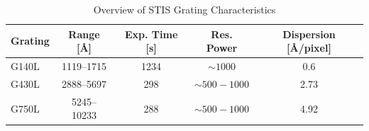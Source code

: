 \begin{table}[h!]
	\centering
	\small
	\caption{Overview of STIS Grating Characteristics \cite{stisgratings}}
	\label{tab:stis_gratings}
	\begin{tabular}{lcccc}
		\hline
		\textbf{Grating} & \textbf{Range [\AA]} & \textbf{Exp. Time [s]} & \textbf{Res. Power} & \textbf{Dispersion [\AA/pixel]} \\
		\hline
		G140L  & 1119--1715  & 1234 & $\sim 1000$         & 0.6 \\
		G430L  & 2888--5697  & 298  & $\sim 500 - 1000$    & 2.73 \\
		G750L  & 5245--10233 & 288  & $\sim 500 - 1000$    & 4.92 \\
		\hline
	\end{tabular}
\end{table}

